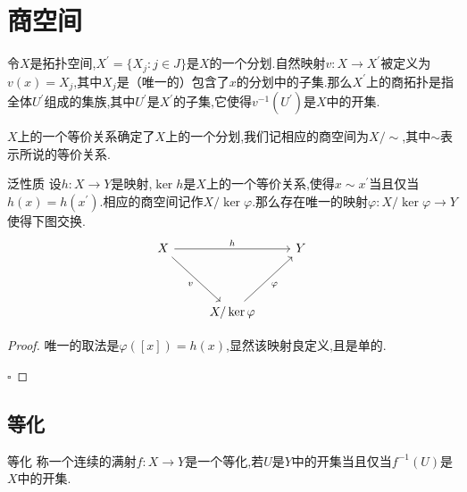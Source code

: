 \documentclass[../../几何与拓扑.tex]{subfiles}
\begin{document}
\section{商空间}

\begin{definition}
    令$X$是拓扑空间,$X^{\prime}=\{ X_{j}:j \in J \}$是$X$的一个分划.自然映射$v:X\to X^{\prime}$被定义为$v\left( x \right)=X_{j}$,其中$X_{j}$是（唯一的）包含了$x$的分划中的子集.那么$X^{\prime}$上的商拓扑是指全体$U^{\prime}$组成的集族,其中$U^{\prime}$是$X^{\prime}$的子集,它使得$v ^{-1} \left( U^{\prime} \right)$是$X$中的开集.
\end{definition}

\begin{remark}
    $X$上的一个等价关系确定了$X$上的一个分划,我们记相应的商空间为$X / \sim$,其中$\sim$表示所说的等价关系.
\end{remark}

\begin{proposition}{泛性质}
    设$h:X\to Y$是映射,$\ker h$是$X$上的一个等价关系,使得$x \sim x^{\prime}$当且仅当$h\left( x \right)=h\left( x^{\prime} \right)$.相应的商空间记作$X / \ker\varphi$.那么存在唯一的映射$\varphi: X/\ker \varphi\to Y$使得下图交换.
    \[
        \begin{tikzcd} X && Y \\ \\ & {X/\ker{\varphi}} \arrow["h", from=1-1, to=1-3] \arrow["v"', from=1-1, to=3-2] \arrow["\varphi"', from=3-2, to=1-3] \end{tikzcd}
    \]
\end{proposition}
\begin{proof}
    唯一的取法是$\varphi \left( [x] \right)=h\left( x \right)$,显然该映射良定义,且是单的.

    \hfill $\square$
\end{proof}

\subsection{等化}

\begin{definition}{等化}
    称一个连续的满射$f:X\to Y$是一个等化,若$U$是$Y$中的开集当且仅当$f^{-1}\left( U \right)$是$X$中的开集.
\end{definition}
\end{document}
